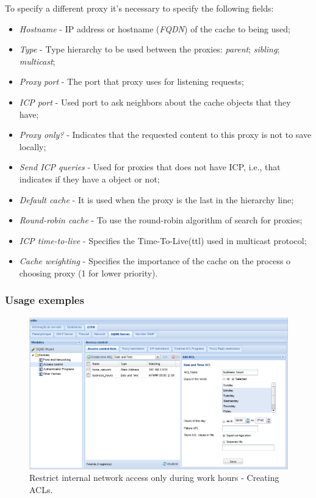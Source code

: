 To specify a different proxy it's necessary to specify the following fields:

\begin{itemize}
    \item \textit{Hostname} - IP address or hostname (\textit{FQDN}) of the cache to being used;
    \item \textit{Type} - Type hierarchy to be used between the proxies:
        \subitem \textit{parent};
        \subitem \textit{sibling};
        \subitem \textit{multicast};
    \item \textit{Proxy port} - The port that proxy uses for listening requests;
    \item \textit{ICP port} - Used port to ask neighbors about the cache objects that they have;
    \item \textit{Proxy only?} - Indicates that the requested content to this proxy is not to save locally; 
    \item \textit{Send ICP queries} - Used for proxies that does not have ICP, i.e., that indicates if they have a object or not;
    \item \textit{Default cache} - It is used when the proxy is the last in the hierarchy line;
    \item \textit{Round-robin cache} - To use the round-robin algorithm of search for proxies;
    \item \textit{ICP time-to-live} - Specifies the Time-To-Live(ttl) used in multicast protocol;
    \item \textit{Cache weighting} - Specifies the importance of the cache on the process o choosing proxy (1 for lower priority).
\end{itemize}

\subsubsection{Usage exemples}

\begin{figure}[H]
    \begin{center}
    \includegraphics[scale=0.38]{screenshots/etfw/etfw_squid_example_time_01_01.png}
    \caption{Restrict internal network access only during work hours - Creating ACLs.}
    \label{fig:etfw_squid_example_time_01_01}
    \end{center}
\end{figure}

